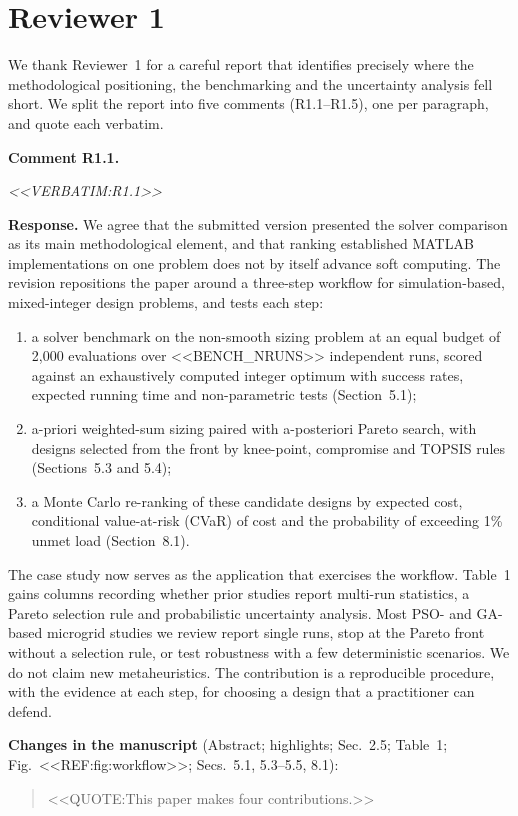 \documentclass[11pt]{article}
\newcounter{rc}
\newcommand{\reviewer}[1]{\section*{Reviewer #1}\setcounter{rc}{0}}
\newcommand{\rcomment}[2]{\stepcounter{rc}\par\medskip
  \noindent\textbf{Comment #1.}\par
  {\color{commentgrey}\itshape #2\par}}
\newcommand{\response}[1]{\par\noindent\textbf{Response.} #1\par}
\newcommand{\change}[2]{\par\noindent\textbf{Changes in the manuscript} (#1):\par
  \begin{quote}\color{revblue}#2\end{quote}}
\begin{document}
\reviewer{1}
We thank Reviewer~1 for a careful report that identifies precisely where the methodological positioning, the benchmarking and the uncertainty analysis fell short. We split the report into five comments (R1.1--R1.5), one per paragraph, and quote each verbatim.

\rcomment{R1.1}{<<VERBATIM:R1.1>>}
\response{We agree that the submitted version presented the solver comparison as its main methodological element, and that ranking established MATLAB implementations on one problem does not by itself advance soft computing. The revision repositions the paper around a three-step workflow for simulation-based, mixed-integer design problems, and tests each step:
\begin{enumerate}[leftmargin=*,itemsep=1pt]
\item a solver benchmark on the non-smooth sizing problem at an equal budget of 2,000 evaluations over <<BENCH_NRUNS>> independent runs, scored against an exhaustively computed integer optimum with success rates, expected running time and non-parametric tests (Section~5.1);
\item a-priori weighted-sum sizing paired with a-posteriori Pareto search, with designs selected from the front by knee-point, compromise and TOPSIS rules (Sections~5.3 and 5.4);
\item a Monte Carlo re-ranking of these candidate designs by expected cost, conditional value-at-risk (CVaR) of cost and the probability of exceeding 1\% unmet load (Section~8.1).
\end{enumerate}
The case study now serves as the application that exercises the workflow. Table~1 gains columns recording whether prior studies report multi-run statistics, a Pareto selection rule and probabilistic uncertainty analysis. Most PSO- and GA-based microgrid studies we review report single runs, stop at the Pareto front without a selection rule, or test robustness with a few deterministic scenarios. We do not claim new metaheuristics. The contribution is a reproducible procedure, with the evidence at each step, for choosing a design that a practitioner can defend.}
\change{Abstract; highlights; Sec.~2.5; Table~1; Fig.~<<REF:fig:workflow>>; Secs.~5.1, 5.3--5.5, 8.1}{<<QUOTE:This paper makes four contributions.>>}
\end{document}
